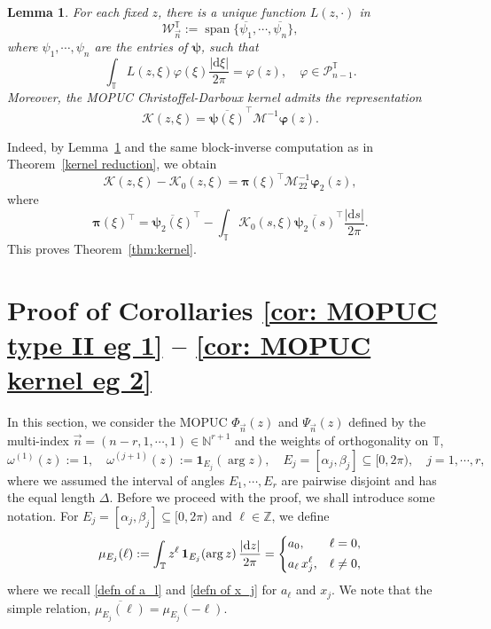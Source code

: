 \documentclass[a4paper,10pt,leqno]{amsart}
\numberwithin{equation}{section}
\newtheorem{lemma}[theorem]{Lemma}
\theoremstyle{remark}
\newcommand{\dd}{\mathrm{d}}
\newcommand{\Z}{\mathbb{Z}}
\newcommand{\N}{\mathbb{N}}
\newcommand{\TT}{\mathbb{T}}
\begin{document}
\begin{lemma}\label{lem:MOPUC-kernel-uniqueness}
For each fixed $z$, there is a unique function $L(z,\cdot)$ in
\begin{equation}\label{defn of Wn MOPUC}
    \mathcal W_{\vec n}^{\mathbb T}:=
    \operatorname{span}\{\overline{\psi_1},\cdots,\overline{\psi_n}\},
\end{equation}
where $\psi_1,\cdots,\psi_n$ are the entries of $\bm{\psi}$, such that
\[
\int_{\mathbb T} L(z,\xi)\varphi(\xi)\frac{|\dd \xi|}{2\pi} = \varphi(z), \quad \varphi \in \mathcal P_{n-1}^{\TT}.
\]
Moreover, the MOPUC Christoffel-Darboux kernel admits the representation
\begin{equation}\label{K=psiMphiinv MOPUC}
    \mathcal K(z,\xi)
    = \overline{\bm{\psi}(\xi)}^\top  \bm{\mathcal M}^{-1}  \bm{\varphi}(z).
\end{equation}
\end{lemma}


Indeed, by Lemma~\ref{lem:MOPUC-kernel-uniqueness} and the same block-inverse computation as in
Theorem~\ref{kernel reduction}, we obtain
\begin{equation}
    \mathcal K(z,\xi)-\mathcal K_0(z,\xi)  = \bm\pi(\xi)^\top  \bm{\mathcal M}_{22}^{-1} \bm\varphi_2(z),
\end{equation}
where
\begin{equation}
    \bm\pi(\xi)^\top = \overline{\bm{\psi}_2(\xi)}^\top -\int_{\mathbb T}\mathcal K_0(s,\xi) \overline{\bm{\psi}_2(s)}^\top \frac{|\dd s|}{2\pi}.
\end{equation}
This proves Theorem~\ref{thm:kernel}.
\section{Proof of Corollaries \ref{cor: MOPUC type II eg 1} -- \ref{cor: MOPUC kernel eg 2}}
\label{section example MOPUC}

In this section, we consider the MOPUC $\Phi_{\vec{n}}(z)$ and $\Psi_{\vec{n}}(z)$ defined by the multi-index 
$\vec{n} = (n-r, 1, \cdots, 1) \in \N^{r+1}$ and the weights of orthogonality on $\TT$,
\begin{equation} \label{eg 1: weights}
\omega^{(1)}(z) := 1,\quad
\omega^{(j+1)}(z) := \mathbf{1}_{E_j}(\arg z),\quad
E_j=[\alpha_j,\beta_j] \subseteq [0, 2\pi), \quad j=1,\cdots,r,
\end{equation}
where we assumed the interval of angles $E_1, \cdots, E_r$ are pairwise disjoint and has the equal length $\Delta$.
Before we proceed with the proof, we shall introduce some notation.
For $E_j = [\alpha_j,\beta_j] \subseteq [0,2\pi)$ and $\ell \in \Z$, we define
\begin{equation}\label{defn of mu}
\mu_{E_j}(\ell) :=\int_{\TT} z^\ell \,\mathbf{1}_{E_j} (\arg z) \, \frac{|\dd z|}{2\pi} = 
\begin{dcases}
a_0, & \ell=0,\\
a_{\ell} \, x_j^\ell, & \ell\neq 0,
\end{dcases}
\end{equation}
where we recall \eqref{defn of a_l} and \eqref{defn of x_j} for $a_\ell$ and $x_j$. We note that the simple relation, $\overline{\mu_{E_j}(\ell)} = \mu_{E_j}(-\ell)$.
\end{document}
